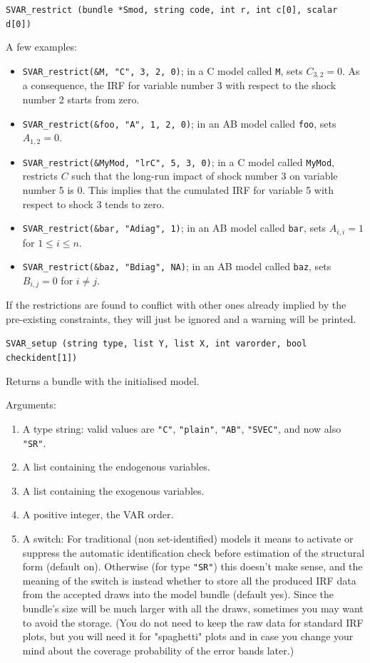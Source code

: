 \documentclass[a4paper,10pt]{article}
\newenvironment{funcdoc}[1]
{\noindent\hrulefill\newline\nopagebreak\texttt{#1}%
\nopagebreak\par\noindent\hrulefill%
\nopagebreak\par\nopagebreak\smallskip\nopagebreak\par}
{\bigskip}
\begin{document}
\begin{funcdoc}{SVAR\_restrict (bundle *Smod, string code, int r, int c[0], scalar d[0])}
A few examples: 
\begin{itemize}
\item \texttt{SVAR\_restrict(\&M, "C", 3, 2, 0)}; in a C model called
  \texttt{M}, sets $C_{3,2} = 0$. As a consequence, the IRF for
  variable number 3 with respect to the shock number 2 starts from
  zero.
\item \texttt{SVAR\_restrict(\&foo, "A", 1, 2, 0)}; in an AB model called
  \texttt{foo}, sets $A_{1,2} = 0$.
\item \texttt{SVAR\_restrict(\&MyMod, "lrC", 5, 3, 0)}; in a C model
  called \texttt{MyMod}, restricts $C$ such that the long-run impact
  of shock number 3 on variable number 5 is 0. This implies that the
  cumulated IRF for variable 5 with respect to shock 3 tends to zero.
\item \texttt{SVAR\_restrict(\&bar, "Adiag", 1)}; in an AB model called
  \texttt{bar}, sets $A_{i,i} = 1$ for $1 \le i \le n$.
\item \texttt{SVAR\_restrict(\&baz, "Bdiag", NA)}; in an AB model called
  \texttt{baz}, sets $B_{i,j} = 0$ for $i \ne j$.
\end{itemize}

If the restrictions are found to conflict with other ones already
implied by the pre-existing constraints, they will just be ignored and
a warning will be printed.
\end{funcdoc}

\begin{funcdoc}{SVAR\_setup (string type, list Y, list X, int varorder, 
  bool checkident[1])}
  \noindent Returns a bundle with the initialised model. 
  
  \noindent Arguments:
  \begin{enumerate}
  \item A type string: valid values are \texttt{"C"},
    \texttt{"plain"}, \texttt{"AB"}, \texttt{"SVEC"}, and now also \texttt{"SR"}.
  \item A list containing the endogenous variables.
  \item A list containing the exogenous variables.
  \item A positive integer, the VAR order.
  \item A switch: For traditional (non set-identified) models it means to activate or suppress 
   the automatic identification check before estimation of the structural form (default on). 
   Otherwise (for type \texttt{"SR"}) this doesn't make sense, and the meaning of the switch
   is instead whether to store all the produced IRF data from the accepted draws into the 
   model bundle (default yes). Since the bundle's size will be much larger with all the draws,
   sometimes you may want to avoid the storage. (You do not need to keep the raw data for 
   standard IRF plots, but you will need it for "spaghetti" plots and in case you change your 
   mind about the coverage probability of the error bands later.)
  \end{enumerate}
\end{funcdoc}
\end{document}
